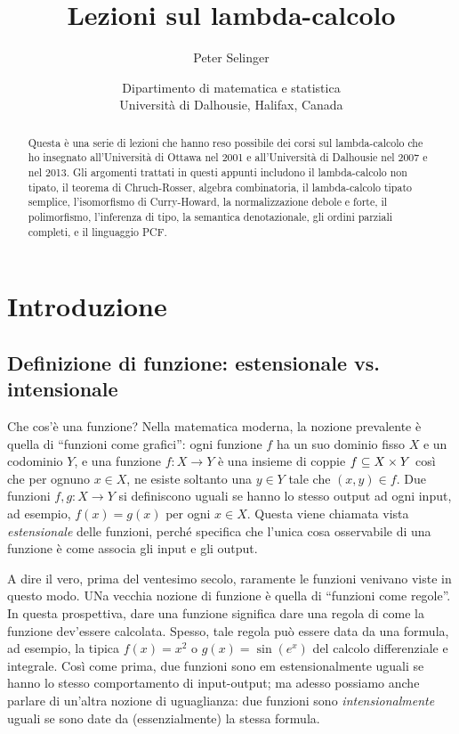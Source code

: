 \documentclass{article}
\title{Lezioni sul lambda-calcolo}
\author{Peter Selinger}
\date{Dipartimento di matematica e statistica\\
  Universit\`a di Dalhousie, Halifax, Canada}
\begin{document}
\maketitle

\begin{abstract}
Questa \`e una serie di lezioni che hanno reso possibile dei corsi sul 
lambda-calcolo che ho insegnato all'Universit\`a di Ottawa nel 2001 e 
all'Universit\`a di Dalhousie nel 2007 e nel 2013. Gli argomenti trattati 
in questi appunti includono il lambda-calcolo non tipato, il teorema 
di Chruch-Rosser, algebra combinatoria, il lambda-calcolo tipato semplice, 
l'isomorfismo di Curry-Howard, la normalizzazione debole 
e forte, il polimorfismo, l'inferenza di tipo, la semantica denotazionale, 
gli ordini parziali completi, e il linguaggio PCF.
\end{abstract}

\tableofcontents

\newpage

\section{Introduzione}\label{sec-intro}

\subsection{Definizione di funzione: estensionale vs. intensionale}
\label{subsec-intro1}

Che cos'\`e una funzione? Nella matematica moderna, la nozione prevalente
\`e quella di ``funzioni come grafici'': ogni funzione $f$ ha un suo dominio
fisso $X$ e un codominio $Y$, e una funzione $f:X\to Y$ \`e una insieme di coppie
$f\subseteq X\times Y$ cos\`i che per ognuno $x\in X$, ne esiste soltanto
una $y\in Y$ tale che $(x,y)\in f$. Due funzioni $f,g:X\to Y$ si
definiscono uguali se hanno lo stesso output ad ogni input, ad esempio,
$f(x)=g(x)$ per ogni $x\in X$. Questa viene chiamata vista {\em estensionale}
delle funzioni, perché specifica che l'unica cosa osservabile 
di una funzione \`e come associa gli input e gli output.

A dire il vero, prima del ventesimo secolo, raramente le funzioni venivano
viste in questo modo. UNa vecchia nozione di funzione \`e quella di ``funzioni come 
regole''. In questa prospettiva, dare una funzione significa dare una regola di
come la funzione dev'essere calcolata. Spesso, tale regola pu\`o essere data da
una formula, ad esempio, la tipica $f(x)=x^2$ o $g(x)=\sin(e^x)$
del calcolo differenziale e integrale. Cos\`i come prima, due funzioni
sono {em estensionalmente} uguali se hanno lo stesso comportamento di input-output;
ma adesso possiamo anche parlare di un'altra nozione di uguaglianza: due funzioni sono
{\em intensionalmente} uguali se sono date da (essenzialmente) la
stessa formula.
\end{document}

